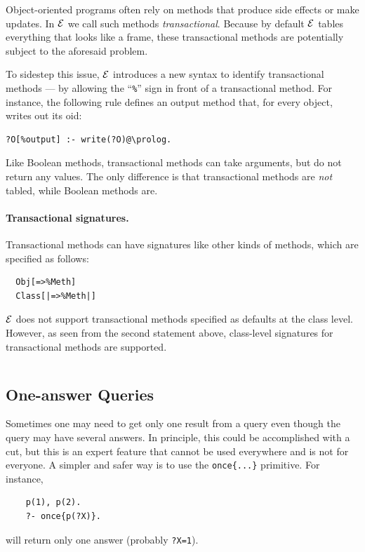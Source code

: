 \documentclass[11pt]{article}
\newcommand{\ERGO}{\mbox{\ensuremath{\cal{E}}\smaller{{\sc{RGO}}}}\xspace}
\newcommand{\FLSYSTEM}{\ERGO}
\begin{document}
Object-oriented programs often rely on methods that produce side effects
or make updates.  In \FLSYSTEM we call such methods 
\emph{transactional}.
Because by default \FLSYSTEM tables everything that looks like a frame,
these transactional methods are potentially subject to the aforesaid problem.

To sidestep this issue, \FLSYSTEM introduces a new syntax to identify
transactional methods --- by allowing the ``\verb|%|'' sign in front of a
transactional method. For instance, the following rule defines an output
method that, for every object, writes out its oid:
\begin{verbatim}
?O[%output] :- write(?O)@\prolog.
\end{verbatim}
Like Boolean methods, transactional methods can take arguments, but do not
return any values.  The only difference is that transactional methods are
\emph{not} tabled, while Boolean methods are.

\paragraph{Transactional signatures.}
Transactional methods can have signatures like other kinds of methods, which
are specified as follows:
\begin{verbatim}
  Obj[=>%Meth]
  Class[|=>%Meth|]
\end{verbatim}
\FLSYSTEM does not support transactional methods specified as defaults at the
class level. However, as seen from the second statement above, class-level
signatures for transactional methods are supported.
\begin{verbatim}
\end{verbatim}

\subsection{One-answer Queries}

Sometimes one may need to get only one result from a query even though the
query may have several answers. In principle, this could be accomplished
with a cut, but this is an expert feature that cannot be used everywhere
and is not for everyone.
A simpler and safer way is to use the \texttt{once\{...\}} primitive.
For instance,
\begin{verbatim}
    p(1), p(2).
    ?- once{p(?X)}.
\end{verbatim}
will return only one answer (probably \texttt{?X=1}).
\end{document}
